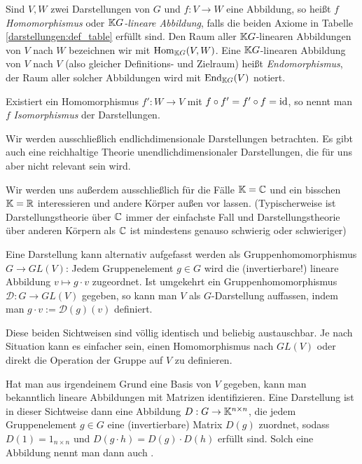 \begin{definition}[Darstellungen]
Sind $V,W$ zwei Darstellungen von $G$ und $f: V\to W$ eine Abbildung, so heißt $f$ \emph{Homomorphismus} oder \emph{$\mathbb{K} G$-lineare Abbildung}, falls die beiden Axiome in Tabelle \ref{darstellungen:def_table} erfüllt sind. Den Raum aller $\mathbb{K} G$-linearen Abbildungen von $V$ nach $W$ bezeichnen wir mit $\operatorname{Hom}_{\mathbb{K} G}(V,W)$. Eine $\mathbb{K} G$-linearen Abbildung von $V$ nach $V$ (also gleicher Definitions- und Zielraum) heißt \emph{Endomorphismus}, der Raum aller solcher Abbildungen wird mit $\operatorname{End}_{\mathbb{K} G}(V)$ notiert.

Existiert ein Homomorphismus $f': W\to V$ mit $f\circ f'=f'\circ f=\operatorname{id}$, so nennt man $f$ \emph{Isomorphismus} der Darstellungen.
\end{definition}

\begin{convention}
Wir werden ausschließlich endlichdimensionale Darstellungen betrachten. Es gibt auch eine reichhaltige Theorie unendlichdimensionaler Darstellungen, die für uns aber nicht relevant sein wird.

Wir werden uns außerdem ausschließlich für die Fälle $\mathbb{K}=\mathbb{C}$ und ein bisschen $\mathbb{K}=\mathbb{R}$ interessieren und andere Körper außen vor lassen. (Typischerweise ist Darstellungstheorie über $\mathbb{C}$ immer der einfachste Fall und Darstellungstheorie über anderen Körpern als $\mathbb{C}$ ist mindestens genauso schwierig oder schwieriger)
\end{convention}

\begin{remark}
Eine Darstellung kann alternativ aufgefasst werden als Gruppenhomomorphismus $G\to GL(V)$: Jedem Gruppenelement $g\in G$ wird die (invertierbare!) lineare Abbildung $v\mapsto g\cdot v$ zugeordnet. Ist umgekehrt ein Gruppenhomomorphismus $\mathcal{D}: G\to GL(V)$ gegeben, so kann man $V$ als $G$-Darstellung auffassen, indem man $g\cdot v:=\mathcal{D}(g)(v)$ definiert.

Diese beiden Sichtweisen sind völlig identisch und beliebig austauschbar. Je nach Situation kann es einfacher sein, einen Homomorphismus nach $GL(V)$ oder direkt die Operation der Gruppe auf $V$ zu definieren.

\medbreak
Hat man aus irgendeinem Grund eine Basis von $V$ gegeben, kann man bekanntlich lineare Abbildungen mit Matrizen identifizieren. Eine Darstellung ist in dieser Sichtweise dann eine Abbildung ${D}: G\to \mathbb{K}^{n\times n}$, die jedem Gruppenelement $g\in G$ eine (invertierbare) Matrix $D(g)$ zuordnet, sodass $D(1)=1_{n\times n}$ und $D(g\cdot h)=D(g)\cdot D(h)$ erfüllt sind. Solch eine Abbildung nennt man dann auch .
\end{remark}

